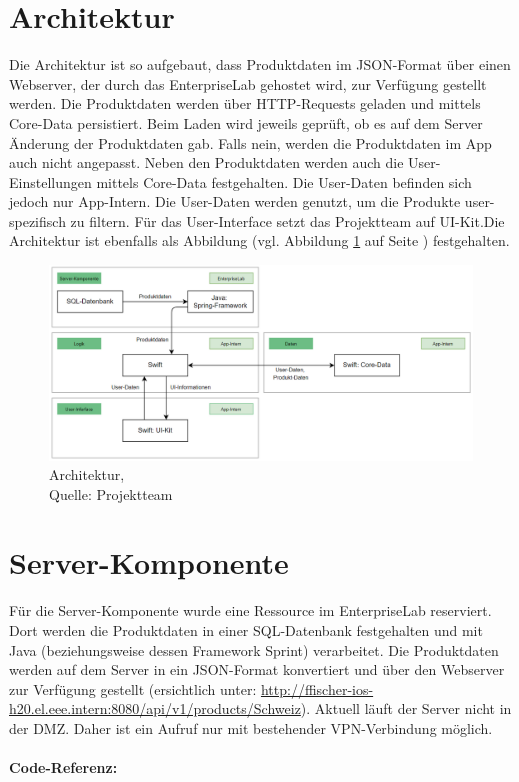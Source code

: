 \documentclass[12pt,titlepage]{article}
\begin{document}
\section*{Architektur}
Die Architektur ist so aufgebaut, dass Produktdaten im JSON-Format über einen Webserver, der durch das EnterpriseLab gehostet wird, zur Verfügung gestellt werden. Die Produktdaten werden über HTTP-Requests geladen und mittels Core-Data persistiert. Beim Laden wird jeweils geprüft, ob es auf dem Server Änderung der Produktdaten gab. Falls nein, werden die Produktdaten im App auch nicht angepasst. Neben den Produktdaten werden auch die User-Einstellungen mittels Core-Data festgehalten. Die User-Daten befinden sich jedoch nur App-Intern. Die User-Daten werden genutzt, um die Produkte user-spezifisch zu filtern. Für das User-Interface setzt das Projektteam auf UI-Kit.Die Architektur ist ebenfalls als Abbildung (vgl. Abbildung \ref{img: Architektur} auf Seite \pageref{img: Architektur}) festgehalten.\\
\begin{figure}[H]
	\centering
	\includegraphics[width=16cm]{Img/Architektur.png}
	\caption[Architektur]{Architektur,\\ Quelle: Projektteam}
	\label{img: Architektur}
\end{figure}

\section*{Server-Komponente}
Für die Server-Komponente wurde eine Ressource im EnterpriseLab reserviert. Dort werden die Produktdaten in einer SQL-Datenbank festgehalten und mit Java (beziehungsweise dessen Framework Sprint) verarbeitet. Die Produktdaten werden auf dem Server in ein JSON-Format konvertiert und über den Webserver zur Verfügung gestellt (ersichtlich unter: \url{http://ffischer-ios-h20.el.eee.intern:8080/api/v1/products/Schweiz}). Aktuell läuft der Server nicht in der DMZ. Daher ist ein Aufruf nur mit bestehender VPN-Verbindung möglich.\\
\\
\textbf{Code-Referenz: }
\end{document}
